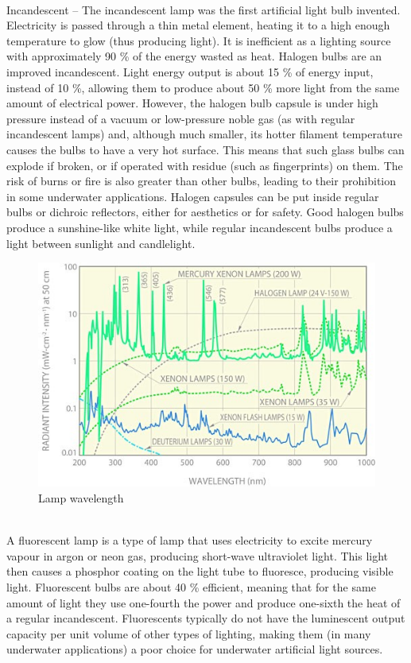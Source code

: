 \\
Incandescent – The incandescent lamp was the first artificial light bulb invented.
Electricity is passed through a thin metal element, heating it to a high enough temperature to glow (thus producing light). It is inefficient as a lighting source with approximately 90 \% of the energy wasted as heat. Halogen bulbs are an improved incandescent. Light energy output is about 15 \% of energy input,  instead of 10 \%, allowing them to produce about 50 \% more light from the same amount of electrical power. However, the halogen bulb capsule is under high pressure instead of a vacuum or low-pressure noble gas (as with regular
incandescent lamps) and, although much smaller, its hotter filament temperature causes the bulbs to have a very hot surface. This means that such glass bulbs can explode if broken, or if operated with residue (such as fingerprints) on them. The risk of burns or fire is also greater than other bulbs, leading to their prohibition in
some underwater applications. Halogen capsules can be put inside regular bulbs or dichroic reflectors, either for aesthetics or for safety. Good halogen bulbs produce a sunshine-like white light, while regular incandescent bulbs produce a light between sunlight and candlelight.
\begin{figure}[htb]
\centering
\includegraphics[scale=1]{figures/camera/bh7.jpg}
\caption{Lamp wavelength}
\end{figure}
\\
A fluorescent lamp is a type of lamp that uses electricity to excite
mercury vapour in argon or neon gas, producing short-wave ultraviolet light. This
light then causes a phosphor coating on the light tube to fluoresce, producing
visible light. Fluorescent bulbs are about 40 \% efficient, meaning that for
the same amount of light they use one-fourth the power and produce one-sixth the
heat of a regular incandescent. Fluorescents typically do not have the luminescent
output capacity per unit volume of other types of lighting, making them (in many
underwater applications) a poor choice for underwater artificial light sources.

